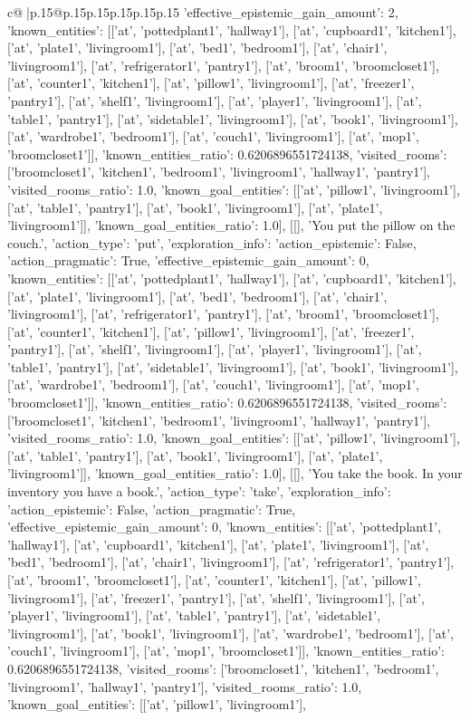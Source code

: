 \documentclass{article}
\begin{document}
{\begin{supertabular}{c@{$\;$}|p{.15\linewidth}@{}p{.15\linewidth}p{.15\linewidth}p{.15\linewidth}p{.15\linewidth}p{.15\linewidth}}
{{{'effective_epistemic_gain_amount': 2, 'known_entities': [['at', 'pottedplant1', 'hallway1'], ['at', 'cupboard1', 'kitchen1'], ['at', 'plate1', 'livingroom1'], ['at', 'bed1', 'bedroom1'], ['at', 'chair1', 'livingroom1'], ['at', 'refrigerator1', 'pantry1'], ['at', 'broom1', 'broomcloset1'], ['at', 'counter1', 'kitchen1'], ['at', 'pillow1', 'livingroom1'], ['at', 'freezer1', 'pantry1'], ['at', 'shelf1', 'livingroom1'], ['at', 'player1', 'livingroom1'], ['at', 'table1', 'pantry1'], ['at', 'sidetable1', 'livingroom1'], ['at', 'book1', 'livingroom1'], ['at', 'wardrobe1', 'bedroom1'], ['at', 'couch1', 'livingroom1'], ['at', 'mop1', 'broomcloset1']], 'known_entities_ratio': 0.6206896551724138, 'visited_rooms': ['broomcloset1', 'kitchen1', 'bedroom1', 'livingroom1', 'hallway1', 'pantry1'], 'visited_rooms_ratio': 1.0, 'known_goal_entities': [['at', 'pillow1', 'livingroom1'], ['at', 'table1', 'pantry1'], ['at', 'book1', 'livingroom1'], ['at', 'plate1', 'livingroom1']], 'known_goal_entities_ratio': 1.0}}], [[], 'You put the pillow on the couch.', {'action_type': 'put', 'exploration_info': {'action_epistemic': False, 'action_pragmatic': True, 'effective_epistemic_gain_amount': 0, 'known_entities': [['at', 'pottedplant1', 'hallway1'], ['at', 'cupboard1', 'kitchen1'], ['at', 'plate1', 'livingroom1'], ['at', 'bed1', 'bedroom1'], ['at', 'chair1', 'livingroom1'], ['at', 'refrigerator1', 'pantry1'], ['at', 'broom1', 'broomcloset1'], ['at', 'counter1', 'kitchen1'], ['at', 'pillow1', 'livingroom1'], ['at', 'freezer1', 'pantry1'], ['at', 'shelf1', 'livingroom1'], ['at', 'player1', 'livingroom1'], ['at', 'table1', 'pantry1'], ['at', 'sidetable1', 'livingroom1'], ['at', 'book1', 'livingroom1'], ['at', 'wardrobe1', 'bedroom1'], ['at', 'couch1', 'livingroom1'], ['at', 'mop1', 'broomcloset1']], 'known_entities_ratio': 0.6206896551724138, 'visited_rooms': ['broomcloset1', 'kitchen1', 'bedroom1', 'livingroom1', 'hallway1', 'pantry1'], 'visited_rooms_ratio': 1.0, 'known_goal_entities': [['at', 'pillow1', 'livingroom1'], ['at', 'table1', 'pantry1'], ['at', 'book1', 'livingroom1'], ['at', 'plate1', 'livingroom1']], 'known_goal_entities_ratio': 1.0}}], [[], 'You take the book. In your inventory you have a book.', {'action_type': 'take', 'exploration_info': {'action_epistemic': False, 'action_pragmatic': True, 'effective_epistemic_gain_amount': 0, 'known_entities': [['at', 'pottedplant1', 'hallway1'], ['at', 'cupboard1', 'kitchen1'], ['at', 'plate1', 'livingroom1'], ['at', 'bed1', 'bedroom1'], ['at', 'chair1', 'livingroom1'], ['at', 'refrigerator1', 'pantry1'], ['at', 'broom1', 'broomcloset1'], ['at', 'counter1', 'kitchen1'], ['at', 'pillow1', 'livingroom1'], ['at', 'freezer1', 'pantry1'], ['at', 'shelf1', 'livingroom1'], ['at', 'player1', 'livingroom1'], ['at', 'table1', 'pantry1'], ['at', 'sidetable1', 'livingroom1'], ['at', 'book1', 'livingroom1'], ['at', 'wardrobe1', 'bedroom1'], ['at', 'couch1', 'livingroom1'], ['at', 'mop1', 'broomcloset1']], 'known_entities_ratio': 0.6206896551724138, 'visited_rooms': ['broomcloset1', 'kitchen1', 'bedroom1', 'livingroom1', 'hallway1', 'pantry1'], 'visited_rooms_ratio': 1.0, 'known_goal_entities': [['at', 'pillow1', 'livingroom1'], }}}
\end{supertabular}}
\end{document}
